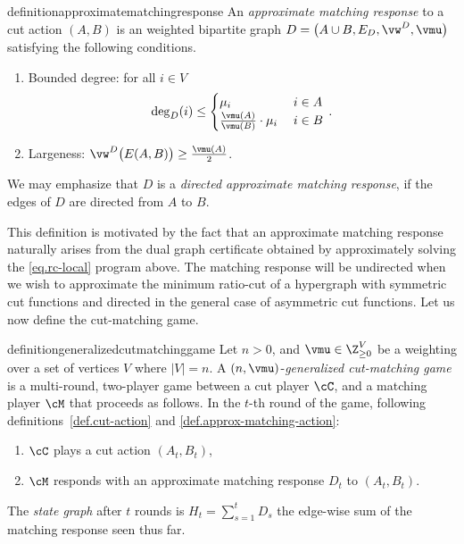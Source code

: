 \documentclass[letterpaper]{article}
\begin{document}
\begin{restatable}{definition}{approximatematchingresponse}\label{def.approx-matching-action}
An \emph{approximate matching response} to a cut action $(A, B)$ is an weighted bipartite graph $D = \big( A \cup B, E_D, \vw^D, \vmu \big)$ satisfying the following conditions.
\begin{enumerate}
\item Bounded degree: for all $i \in V$
\begin{equation*}
\deg_D(i)
\leq \begin{cases}
  \mu_i \; &i \in A \\
  \frac{\vmu(A)}{\vmu(B)} \cdot \mu_i \;& i \in B
\end{cases} \, .
\end{equation*}

\item Largeness: $\vw^D \big( E(A, B) \big) \geq {\vmu(A) \over 2}$.
\end{enumerate}
We may emphasize that $D$ is a \emph{directed approximate matching response}, if the edges of $D$ are directed from $A$ to $B.$
\end{restatable}

\noindent
This definition is motivated by the fact that an approximate matching response naturally arises from the dual graph certificate obtained by approximately solving the \eqref{eq.rc-local} program above. The matching response will be undirected when we wish to approximate the minimum ratio-cut of a hypergraph with symmetric cut functions and directed in the general case of asymmetric cut functions. Let us now define the cut-matching game.

\begin{restatable}{definition}{generalizedcutmatchinggame}
\label{def.cut-matching-game}
Let $n > 0$, and $\vmu \in \Z^V_{\geq 0}$ be a weighting over a set of vertices $V$ where $\lvert V \rvert = n$. A $(n, \vmu)$-\emph{generalized cut-matching game} is a multi-round, two-player game between a cut player $\cC$, and a matching player $\cM$ that proceeds as follows. In the $t$-th round of the game, following definitions~\ref{def.cut-action} and \ref{def.approx-matching-action}:
\begin{enumerate}
\item $\cC$ plays a cut action $(A_t, B_t)$,

\item $\cM$ responds with an approximate matching response $D_t$ to $(A_t, B_t)$.
\end{enumerate}
The \emph{state graph} after $t$ rounds is $H_t = \sum_{s=1}^t D_s$ the edge-wise sum of the matching response seen thus far.
\end{restatable}
\end{document}
